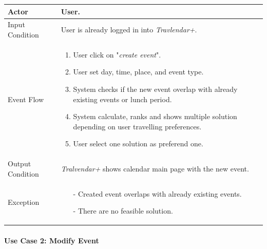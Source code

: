 		\begin{tabular}{| l | p{} | }
			\hline
			\hline
			Actor	&		User. \\
			\hline
			Input Condition		&		User is already logged in into \textit{Travlendar+}. \\
			\hline
			Event Flow		&		\begin{enumerate}
												\item User click on "\textit{create event}".
												\item User set day, time, place, and event type.
												\item System checks if the new event overlap with already existing events or lunch period.
												\item	 System calculate, ranks and shows multiple solution depending on user travelling preferences.
												\item User select one solution as preferend one.
											\end{enumerate} \\
			\hline
			Output Condition		&		\textit{Tralvendar+} shows calendar main page with the new event. \\
			\hline		
			Exception		&		\begin{itemize}
											\item[-] Created event overlaps with already existing events.
											\item[-] There are no feasible solution.
										\end{itemize} \\
			\hline
			\hline
		\end{tabular}



	\paragraph{Use Case 2: Modify Event}
	
